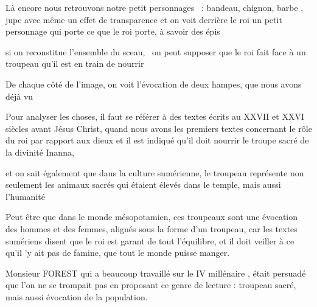 \documentclass[a4paper]{article}
\begin{document}
\bigskip

{
Là encore nous retrouvons notre petit personnages \ : bandeau, chignon, barbe , jupe avec même un effet de transparence
et on voit derrière le roi un petit personnage qui porte ce que le roi porte, à savoir des épis}

{
si on reconstitue l'ensemble du sceau, \ on peut supposer que le roi fait face à un troupeau qu'il est en train de
nourrir}


\bigskip

{
De chaque côté de l'image, on voit l'évocation de deux hampes, que nous avons déjà vu}


\bigskip

{
Pour analyser les choses, il faut se référer à des textes écrits au XXVII et XXVI siècles avant Jésus Christ, quand nous
avons les premiers textes concernant le rôle du roi par rapport aux dieux et il est indiqué qu'il doit nourrir le
troupe sacré de la divinité Inanna, }

{
et on sait également que dans la culture sumérienne, le troupeau représente non seulement les animaux sacrés qui étaient
élevés dans le temple, mais aussi l'humanité}


\bigskip

{
Peut être que dans le monde mésopotamien, ces troupeaux sont une évocation des hommes et des femmes, alignés sous la
forme d'un troupeau, car les textes sumériens disent que le roi est garant de tout l'équilibre, et il doit veiller à ce
qu'il 'y ait pas de famine, que tout le monde puisse manger.}


\bigskip

{
Monsieur FOREST qui a beaucoup travaillé sur le IV millénaire , était persuadé que l'on ne se trompait pas en proposant
ce genre de lecture : troupeau sacré, mais aussi évocation de la population.}


\bigskip


\bigskip


\bigskip


\bigskip


\bigskip


\bigskip


\bigskip


\bigskip


\bigskip


\bigskip


\bigskip
\end{document}
